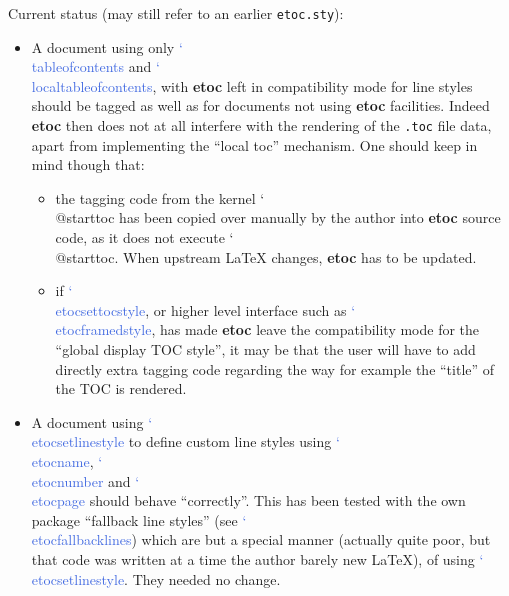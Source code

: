 \documentclass{article}
\DeclareRobustCommand\csa [1]
                {{\ttfamily\hyphenchar\font45 \char`\\ #1}}
\def\csb#1{\textcolor{RoyalBlue}{\csa{#1}}}
\newcommand\etoc{%
        \texorpdfstring{{\color{joli}\ttfamily\bfseries etoc}}{etoc}\xspace}
\newcommand\toc{\csb{tableofcontents}\xspace}
\newcommand\localtoc{\csb{localtableofcontents}\xspace}
\begin{document}
Current status (may still refer to an earlier \texttt{etoc.sty}):
\begin{itemize}
\item A document using only \toc and \localtoc, with \etoc left in
  compatibility mode for line styles should be tagged as well as
  for documents not using \etoc facilities.  Indeed
  \etoc then does not at all interfere with the rendering of the
  \texttt{.toc} file data, apart from implementing the ``local toc''
  mechanism.  One should keep in mind though that:
  \begin{itemize}
  \item the tagging code from the kernel \csa{@starttoc} has been copied
    over manually by the author into \etoc source code, as it does not
    execute \csa{@starttoc}.  When upstream \LaTeX{} changes, \etoc has
    to be updated.
  \item if \csb{etocsettocstyle}, or higher level interface such as
    \csb{etocframedstyle}, has made \etoc leave the compatibility mode for the
    ``global display TOC style'', it may be that the user will have to add
    directly extra tagging code regarding the way for example the
    ``title'' of the TOC is rendered.
  \end{itemize}

\item A document using \csb{etocsetlinestyle} to define custom line
  styles using \csb{etocname}, \csb{etocnumber} and \csb{etocpage}
  should behave ``correctly''.  This has been tested with the own
  package ``fallback line styles'' (see \csb{etocfallbacklines}) which
  are but a special manner (actually quite poor, but that code was
  written at a time the author barely new \LaTeX), of using
  \csb{etocsetlinestyle}.  They needed no change.


\end{itemize}
\end{document}
